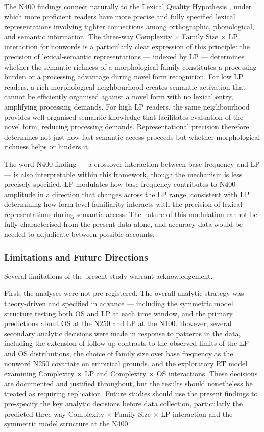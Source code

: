 \documentclass[utf8]{FrontiersinHarvard} %
\begin{document}
	The N400 findings connect naturally to the Lexical Quality Hypothesis \citep{Perfetti2007}, under which more proficient readers have more precise and fully specified lexical representations involving tighter connections among orthographic, phonological, and semantic information. The three-way Complexity $\times$ Family Size $\times$ LP interaction for nonwords is a particularly clear expression of this principle: the precision of lexical-semantic representations --- indexed by LP --- determines whether the semantic richness of a morphological family constitutes a processing burden or a processing advantage during novel form recognition. For low LP readers, a rich morphological neighbourhood creates semantic activation that cannot be efficiently organised against a novel form with no lexical entry, amplifying processing demands. For high LP readers, the same neighbourhood provides well-organised semantic knowledge that facilitates evaluation of the novel form, reducing processing demands. Representational precision therefore determines not just how fast semantic access proceeds but whether morphological richness helps or hinders it.
	
	The word N400 finding --- a crossover interaction between base frequency and LP --- is also interpretable within this framework, though the mechanism is less precisely specified. LP modulates how base frequency contributes to N400 amplitude in a direction that changes across the LP range, consistent with LP determining how form-level familiarity interacts with the precision of lexical representations during semantic access. The nature of this modulation cannot be fully characterised from the present data alone, and accuracy data would be needed to adjudicate between possible accounts.
	
	\subsubsection{Limitations and Future Directions}
	
	Several limitations of the present study warrant acknowledgement.
	
	First, the analyses were not pre-registered. The overall analytic strategy was theory-driven and specified in advance --- including the symmetric model structure testing both OS and LP at each time window, and the primary predictions about OS at the N250 and LP at the N400. However, several secondary analytic decisions were made in response to patterns in the data, including the extension of follow-up contrasts to the observed limits of the LP and OS distributions, the choice of family size over base frequency as the nonword N250 covariate on empirical grounds, and the exploratory RT model examining Complexity $\times$ LP and Complexity $\times$ OS interactions. These decisions are documented and justified throughout, but the results should nonetheless be treated as requiring replication. Future studies should use the present findings to pre-specify the key analytic decisions before data collection, particularly the predicted three-way Complexity $\times$ Family Size $\times$ LP interaction and the symmetric model structure at the N400.
	
\end{document}
